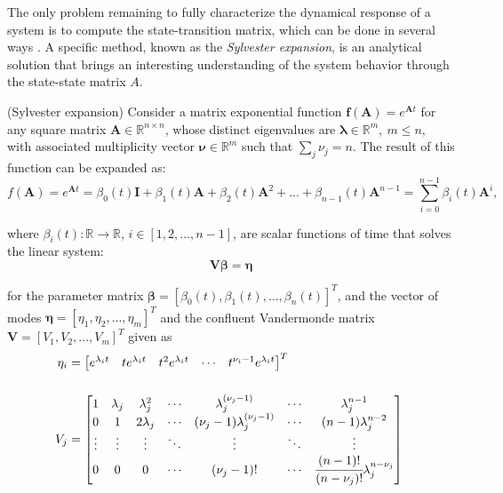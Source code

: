 \documentclass[a4paper,11pt]{book}
\numberwithin{figure}{chapter}
\numberwithin{equation}{chapter}
\numberwithin{table}{chapter}
\newtheorem{theorem}{Theorem}[chapter]
\theoremstyle{definition}
\newcounter{boxed-theorem}
\newenvironment{boxed-theorem}[1]
{\begin{shaded} \begin{theorem}{#1}}
{\end{theorem} \end{shaded}}
\newcounter{boxed-definition}
\begin{document}
The only problem remaining to fully characterize the dynamical response of a system is to compute the state-transition matrix, which can be done in several ways \cite{Moler_VanLoan:2003}. A specific method, known as the \textit{Sylvester expansion}, is an analytical solution that brings an interesting understanding of the system behavior through the state-state matrix $A$.

\begin{boxed-theorem}{(Sylvester expansion)} \label{th:sylvester01}
    Consider a matrix exponential function $\bm{f}(\bm{A}) = e^{\bm{A} t}$ for any square matrix $\bm{A} \in \mathbb{R}^{n \times n}$, whose distinct eigenvalues are $\bm{\lambda} \in \mathbb{R}^{m},\ m \leq n,$ with associated multiplicity vector $\bm{\nu} \in \mathbb{R}^m$ such that $\sum_j \nu_j = n$. The result of this function can be expanded as:
    \begin{equation} \label{eq:sylvester01}
        f(\bm{A}) = e^{\bm{A} t} = \beta_0(t) \bm{I} + \beta_1(t) \bm{A} + \beta_2(t) \bm{A}^2 + ... + \beta_{n-1}(t) \bm{A}^{n-1} = \sum_{i=0}^{n-1} \beta_i(t) \bm{A}^i
    ,\end{equation} 
    
    \noindent where $\beta_i(t) : \mathbb{R} \rightarrow \mathbb{R}$, $i \in [1,2,...,n-1]$, are scalar functions of time that solves the linear system:
    \begin{equation} \label{eq:sylvester02}
        \bm{V} \bm{\beta} = \bm{\eta}
    \end{equation} 
    
    \noindent for the parameter matrix $\bm{\beta} = [\beta_0(t), \beta_1(t), ..., \beta_n(t)]^T$, and the vector of modes $\bm{\eta} = [\eta_1, \eta_2, ..., \eta_m]^T$ and the confluent Vandermonde matrix $\bm{V} = [V_1, V_2, ..., V_m]^T$ given as
    \begin{align*}
        \eta_i & = \begin{bmatrix} e^{\lambda_i t} & te^{\lambda_i t} & t^2e^{\lambda_i t} & \cdots & t^{\nu_i-1}e^{\lambda_i t} \end{bmatrix}^T \\ \\
        V_j     & = \begin{bmatrix}
            1 & \lambda_j & \lambda_j^2 & \cdots & \lambda_j^{(\nu_j - 1)} & \cdots & \lambda_j^{n-1} \\
            0 & 1 & 2\lambda_j & \cdots & (\nu_j - 1) \lambda_j^{(\nu_j - 1)} & \cdots & (n-1)\lambda_j^{n-2} \\
            \vdots & \vdots & \vdots & \ddots & \vdots & \ddots & \vdots \\
            0 & 0 & 0 & \cdots & (\nu_j - 1)! & \cdots & \cfrac{(n - 1)!}{(n - \nu_j)!}\lambda_j^{n-\nu_j} \\
        \end{bmatrix}\
    \end{align*} 
\end{boxed-theorem}
\end{document}
